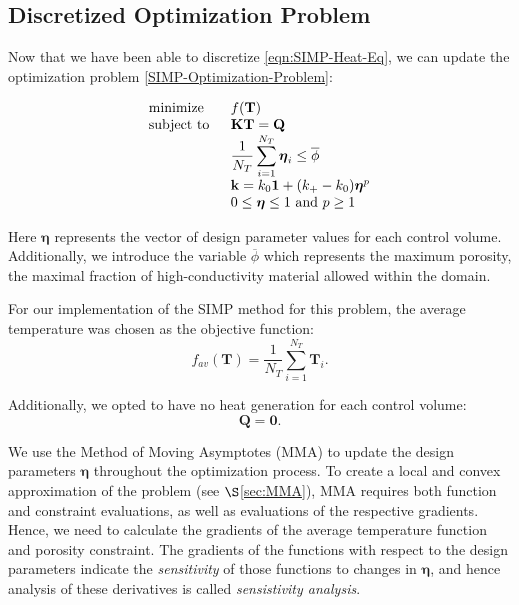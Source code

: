 \subsection{Discretized Optimization Problem}

Now that we have been able to discretize \eqref{eqn:SIMP-Heat-Eq}, we can update the optimization problem \eqref{SIMP-Optimization-Problem}:

\begin{equation}
	\begin{tabular}{ll}
		\text{minimize }   & $f(\mathbf{T})$                                                                                     \\
		\text{subject to } & $\mathbf{K}\mathbf{T}=\mathbf{Q}$                                                                   \\
		                   & $\displaystyle\frac{1}{N_T}\sum_{i=1}^{N_T}\boldsymbol{\eta}_i\leq\overline{\phi}$ \\
		                   & $\mathbf{k}=k_0\mathbf{1}+(k_+-k_0)\boldsymbol{\eta}^p$                                       \\
		                   & $0\leq\boldsymbol{\eta}\leq 1\text{ and } p\geq 1$
	\end{tabular}\label{Discretized-SIMP-Optimization-Problem}
\end{equation}

Here $\boldsymbol{\eta}$ represents the vector of design parameter values for each control volume. Additionally, we introduce the variable $\overline{\phi}$ which represents the maximum porosity, the maximal fraction of high-conductivity material allowed within the domain.

For our implementation of the SIMP method for this problem, the average temperature was chosen as the objective function:
\begin{equation}
	f_{av}\left(\mathbf{T}\right)=\frac{1}{N_T}\sum_{i=1}^{N_T}\mathbf{T}_i.\label{eqn:f_av}
\end{equation}

Additionally, we opted to have no heat generation for each control volume:
\begin{equation}
	\mathbf{Q}=\mathbf{0}.\label{eqn:Q_vec}
\end{equation}

We use the Method of Moving Asymptotes (MMA) to update the design parameters $\boldsymbol{\eta}$ throughout the optimization process. To create a local and convex approximation of the problem (see $\S$\ref{sec:MMA}), MMA requires both function and constraint evaluations, as well as evaluations of the respective gradients. Hence, we need to calculate the gradients of the average temperature function and porosity constraint. The gradients of the functions with respect to the design parameters indicate the \textit{sensitivity} of those functions to changes in $\boldsymbol{\eta}$, and hence analysis of these derivatives is called \textit{sensistivity analysis}.

